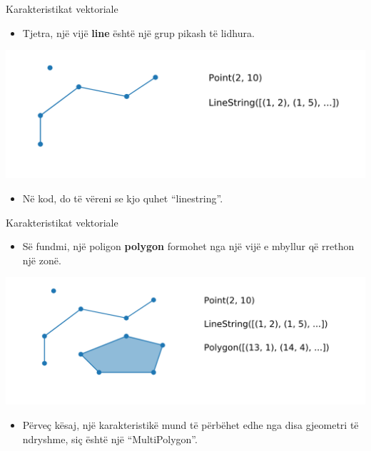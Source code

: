 \documentclass[
  ignorenonframetext,
]{beamer}
\providecommand{\tightlist}{%
  \setlength{\itemsep}{0pt}\setlength{\parskip}{0pt}}
\begin{document}
\begin{frame}{Karakteristikat vektoriale}
\protect\hypertarget{karakteristikat-vektoriale-2}{}
\begin{itemize}
\tightlist
\item
  Tjetra, një vijë \textbf{line} është një grup pikash të lidhura.
\end{itemize}

\includegraphics{./Figs/line.png}

\begin{itemize}
\tightlist
\item
  Në kod, do të vëreni se kjo quhet ``linestring''.
\end{itemize}
\end{frame}

\begin{frame}{Karakteristikat vektoriale}
\protect\hypertarget{karakteristikat-vektoriale-3}{}
\begin{itemize}
\tightlist
\item
  Së fundmi, një poligon \textbf{polygon} formohet nga një vijë e
  mbyllur që rrethon një zonë.
\end{itemize}

\includegraphics{./Figs/polygon.png}

\begin{itemize}
\tightlist
\item
  Përveç kësaj, një karakteristikë mund të përbëhet edhe nga disa
  gjeometri të ndryshme, siç është një ``MultiPolygon''.
\end{itemize}
\end{frame}
\end{document}
